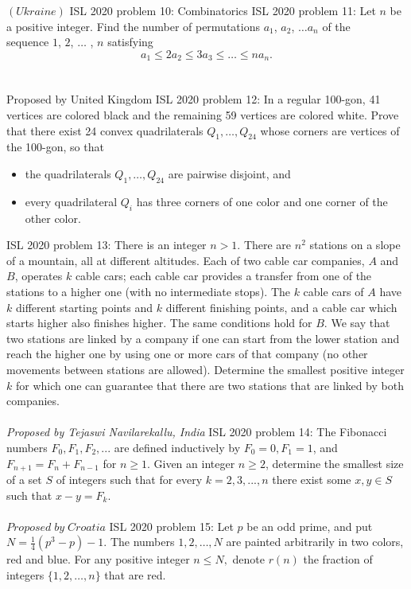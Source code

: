 $(Ukraine)$ 
ISL 2020 problem 10:  Combinatorics 
ISL 2020 problem 11:  Let $n$ be a positive integer. Find the number of permutations $a_1$, $a_2$, $\dots a_n$ of the \\
sequence $1$, $2$, $\dots$ , $n$ satisfying
\[ a_1 \le 2a_2\le 3a_3 \le \dots \le na_n .\] \\\\
Proposed by United Kingdom 
ISL 2020 problem 12:  In a regular 100-gon, 41 vertices are colored black and the remaining 59 vertices are colored white. Prove that there exist 24 convex quadrilaterals $Q_1, \ldots, Q_{24}$ whose corners are vertices of the 100-gon, so that
\begin{itemize}
  \item the quadrilaterals $Q_1, \ldots, Q_{24}$ are pairwise disjoint, and
  \item every quadrilateral $Q_i$ has three corners of one color and one corner of the other color.
\end{itemize} 
ISL 2020 problem 13:  There is an integer $n > 1$. There are $n^2$ stations on a slope of a mountain, all at different altitudes. Each of two cable car companies, $A$ and $B$, operates $k$ cable cars; each cable car provides a transfer from one of the stations to a higher one (with no intermediate stops). The $k$ cable cars of $A$ have $k$ different starting points and $k$ different finishing points, and a cable car which starts higher also finishes higher. The same conditions hold for $B$. We say that two stations are linked by a company if one can start from the lower station and reach the higher one by using one or more cars of that company (no other movements between stations are allowed). Determine the smallest positive integer $k$ for which one can guarantee that there are two stations that are linked by both companies. \\\\
\textit{Proposed by Tejaswi Navilarekallu, India} 
ISL 2020 problem 14:  The Fibonacci numbers $F_0, F_1, F_2, . . .$ are defined inductively by $F_0=0, F_1=1$, and $F_{n+1}=F_n+F_{n-1}$ for $n \ge 1$. Given an integer $n \ge 2$, determine the smallest size of a set $S$ of integers such that for every $k=2, 3, . . . , n$ there exist some $x, y \in S$ such that $x-y=F_k$. \\\\
\textit{$Proposed \;  by \; Croatia$} 
ISL 2020 problem 15:  Let $p$ be an odd prime, and put $N=\frac{1}{4} (p^3 -p) -1.$ The numbers $1,2, \dots, N$ are painted arbitrarily in two colors, red and blue. For any positive integer $n \leqslant N,$ denote $r(n)$ the fraction of integers $\{ 1,2, \dots, n \}$ that are red. \\
